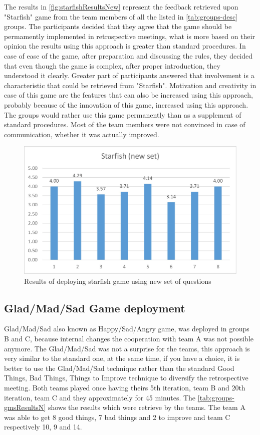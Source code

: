 The results in \autoref{fig:starfishResultsNew} represent the feedback retrieved upon "Starfish" game from the team members of all the listed in \autoref{tab:groups-desc} groups. The participants decided that they agree that the game should be permamently implemented in retrospective meetings, what is more based on their opinion the results using this approach is greater than standard procedures. In case of ease of the game, after preparation and discussing the rules, they decided that even though the game is complex, after proper introduction, they understood it clearly. Greater part of participants answered that involvement is a characteristic that could be retrieved from "Starfish". Motivation and creativity in case of this game are the features that can also be increased using this approach, probably because of the innovation of this game, increased using this approach. The groups would rather use this game permanently than as a supplement of standard procedures. Most of the team members were not convinced in case of communication, whether it was actually improved.

\begin{figure}[!htbp]
\caption{Results of deploying starfish game using new set of questions}
\label{fig:starfishResultsNew}
\centering
\includegraphics[width=1\textwidth]{charts/starfishNewSet}
\end{figure}

\subsection{Glad/Mad/Sad Game deployment}

Glad/Mad/Sad also known as Happy/Sad/Angry game, was deployed in groups B and C, because internal changes the cooperation with team A was not possible anymore. The Glad/Mad/Sad was not a surprise for the teams, this approach is very similar to the standard one, at the same time, if you have a choice, it is better to use the Glad/Mad/Sad technique rather than the standard Good Things, Bad Things, Things to Improve technique to diversify the retrospective meeting. Both teams played once having theirs 5th iteration, team B and 20th iteration, team C and they approximately for 45 minutes. The \autoref{tab:groups-gmsResultsN} shows the results which were retrieve by the teams. The team A was able to get 8 good things, 7 bad things and 2 to improve and team C respectively 10, 9 and 14.

